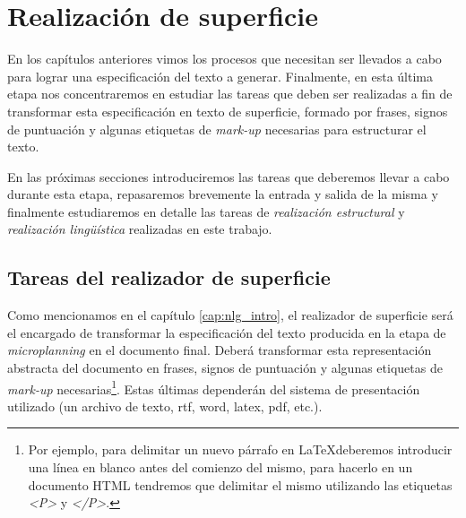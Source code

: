 \chapter{Realización de superficie}
\label{cap:realization}
En los capítulos anteriores vimos los procesos que necesitan ser llevados a cabo para lograr una especificación del texto a generar. Finalmente, en esta última etapa nos concentraremos en estudiar las tareas que deben ser realizadas a fin de transformar esta especificación en texto de superficie, formado por frases, signos de puntuación y algunas etiquetas de \textit{mark-up} necesarias para estructurar el texto.

En las próximas secciones introduciremos las tareas que deberemos llevar a cabo durante esta etapa, repasaremos brevemente la entrada y salida de la misma y finalmente estudiaremos en detalle las tareas de \emph{realización estructural} y \emph{realización lingüística} realizadas en este trabajo.


\section{Tareas del realizador de superficie}

Como mencionamos en el capítulo \ref{cap:nlg_intro}, el realizador de superficie será el encargado de transformar la especificación del texto producida en la etapa de \textit{microplanning} en el documento final. Deberá transformar esta representación abstracta del documento en frases, signos de puntuación y algunas etiquetas de \textit{mark-up} necesarias\footnote{Por ejemplo, para delimitar un nuevo párrafo en \LaTeX deberemos introducir una línea en blanco antes del comienzo del mismo, para hacerlo en un documento HTML tendremos que delimitar el mismo utilizando las etiquetas \textit{<P>} y \textit{</P>}.}. Estas últimas dependerán del sistema de presentación utilizado (un archivo de texto, rtf, word, latex, pdf, etc.).

